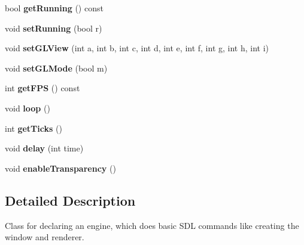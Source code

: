 \begin{DoxyCompactItemize}
\item 
bool {\bfseries get\+Running} () const \hypertarget{classEngine_a8261a8bc23adeaf5a17a1d6301223eda}{}\label{classEngine_a8261a8bc23adeaf5a17a1d6301223eda}

\item 
void {\bfseries set\+Running} (bool r)\hypertarget{classEngine_ac5a84be825afebf377e227bcb049a753}{}\label{classEngine_ac5a84be825afebf377e227bcb049a753}

\item 
void {\bfseries set\+G\+L\+View} (int a, int b, int c, int d, int e, int f, int g, int h, int i)\hypertarget{classEngine_ad5387289f39246870a3c40d61b31fed8}{}\label{classEngine_ad5387289f39246870a3c40d61b31fed8}

\item 
void {\bfseries set\+G\+L\+Mode} (bool m)\hypertarget{classEngine_a0ac77a2abc0269f3825a184fbfcef3dd}{}\label{classEngine_a0ac77a2abc0269f3825a184fbfcef3dd}

\item 
int {\bfseries get\+F\+PS} () const \hypertarget{classEngine_a7b4d5a0722d470402278c05fed39c1f1}{}\label{classEngine_a7b4d5a0722d470402278c05fed39c1f1}

\item 
void {\bfseries loop} ()\hypertarget{classEngine_a514f8d788ced7c6508b8b6f9ef66ccb1}{}\label{classEngine_a514f8d788ced7c6508b8b6f9ef66ccb1}

\item 
int {\bfseries get\+Ticks} ()\hypertarget{classEngine_adfac6631b6c52bcb43811742aa172d9d}{}\label{classEngine_adfac6631b6c52bcb43811742aa172d9d}

\item 
void {\bfseries delay} (int time)\hypertarget{classEngine_a15aa4850592df8924eb542ff0709bd98}{}\label{classEngine_a15aa4850592df8924eb542ff0709bd98}

\item 
void {\bfseries enable\+Transparency} ()\hypertarget{classEngine_a74e701ab9fb6a69713f9867d9962630e}{}\label{classEngine_a74e701ab9fb6a69713f9867d9962630e}

\end{DoxyCompactItemize}


\subsection{Detailed Description}
Class for declaring an engine, which does basic S\+DL commands like creating the window and renderer. 

